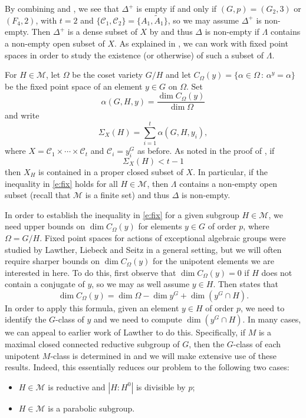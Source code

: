 \documentclass[twoside,a4paper,reqno,11pt]{amsart}
\renewcommand{\a}{\alpha}
\renewcommand{\O}{\Omega}
\newcommand{\<}{\langle}
\renewcommand{\>}{\rangle}
\renewcommand{\:}{\colon}
\theoremstyle{plain}
\theoremstyle{definition}
\begin{document}
By combining \cite[Corollary 4]{BGG1} and \cite[Theorem 1.1]{GMT}, we see that $\Delta^{+}$ is empty if and only if $(G,p) = (G_2,3)$ or $(F_4,2)$, with $t=2$ and $\{\mathcal{C}_1,\mathcal{C}_2\} = \{A_1,\tilde{A}_1\}$, so we may assume $\Delta^+$ is non-empty. Then $\Delta^+$ is a dense subset of $X$ by \cite[Theorem 1]{BGG1} and thus $\Delta$ is non-empty if $\Lambda$ contains a non-empty open subset of $X$. As explained in \cite{BGG1}, we can work with fixed point spaces in order to study the existence (or otherwise) of such a subset of $\Lambda$. 

For $H \in \mathcal{M}$, let $\O$ be the coset variety $G/H$ and let 
$C_{\O}(y) = \{ \a \in \O \,:\, \a^{y} = \a\}$
be the fixed point space of an element $y \in G$ on $\O$. Set 
\[
\a(G,H,y) = \frac{\dim C_{\O}(y)}{\dim \O}
\]
and write 
\[
\Sigma_X(H) = \sum_{i=1}^t \a(G,H,y_i),
\]
where $X = \mathcal{C}_1 \times \cdots \times \mathcal{C}_t$ and $\mathcal{C}_i = y_i^G$ as before. As noted in the proof of \cite[Theorem 5]{BGG1}, if 
\begin{equation}\label{e:fix}
\Sigma_X(H) < t-1
\end{equation}
then $X_H$ is contained in a proper closed subset of $X$. In particular, if the inequality in \eqref{e:fix} holds for all $H \in \mathcal{M}$, then $\Lambda$ contains a non-empty open subset (recall that $\mathcal{M}$ is a finite set) and thus $\Delta$ is non-empty. 

In order to establish the inequality in \eqref{e:fix} for a given subgroup $H \in \mathcal{M}$, we need upper bounds on $\dim C_{\O}(y)$ for elements $y \in G$ of order $p$, where $\O = G/H$. Fixed point spaces for actions of exceptional algebraic groups were studied by Lawther, Liebeck and Seitz \cite{LLS1} in a general setting, but we will often require sharper bounds on $\dim C_{\O}(y)$ for the unipotent elements we are interested in here. To do this, first observe that $\dim C_{\O}(y)=0$ if $H$ does not contain a conjugate of $y$, so we may as well assume $y \in H$. Then \cite[Proposition 1.14]{LLS1} states that
\[
\dim C_{\O}(y) = \dim \O - \dim y^G + \dim (y^G \cap H).
\]
In order to apply this formula, given an element $y \in H$ of order $p$, we need to identify the $G$-class of $y$ and we need to compute $\dim(y^G \cap H)$. In many cases, we can appeal to earlier work of Lawther to do this. Specifically, if $M$ is a maximal closed connected reductive subgroup of $G$, then the $G$-class of each unipotent $M$-class is determined in \cite{Law2} and we will make extensive use of these results. Indeed, this essentially reduces our problem to the following two cases:
\begin{itemize}\addtolength{\itemsep}{0.2\baselineskip}
\item[{\rm (a)}] $H \in \mathcal{M}$ is reductive and $|H:H^0|$ is divisible by $p$;
\item[{\rm (b)}] $H \in \mathcal{M}$ is a parabolic subgroup. 
\end{itemize}
\end{document}
